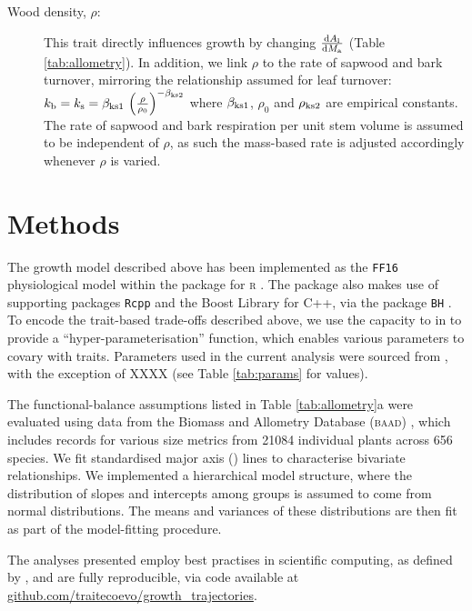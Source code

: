 \documentclass[a4paper,11pt]{article}
\begin{document}
\begin{description}
\item[Wood density, $\rho$:] This trait directly influences growth by changing $\frac{{\rm d}A_{\rm l}}{{\rm d}M_{\rm a}}$ (Table \ref{tab:allometry}). In addition, we link $\rho$ to the rate of sapwood and bark turnover, mirroring the relationship assumed for leaf turnover: $k_{\rm b} = k_{\rm s} = \beta_{{\rm ks1}} \, \left(\frac{\rho}{\rho_0}\right)^{-\beta_{{\rm ks2}}}$ where $\beta_{{\rm ks1}}$, $\rho_0$ and $\rho_{{\rm ks2}}$ are empirical constants. The rate of sapwood and bark respiration per unit stem volume is assumed to be independent of $\rho$, as such the mass-based rate is adjusted accordingly  whenever $\rho$ is varied.
 \end{description}

\section{Methods}

The growth model described above has been implemented as the \texttt{FF16} physiological model within the {\plant} package \citep{Falster-2016} for \textsc{r} \citep{R-2015}. The {\plant} package also makes use of supporting packages \texttt{Rcpp} \citep{Eddelbuettel-2013} and the Boost Library for C++\citep{Schaling-2014}, via the package \texttt{BH} \citep{Eddelbuettel-2015}. To encode the trait-based trade-offs described above, we use the capacity to in {\plant} to provide a ``hyper-parameterisation'' function, which enables various parameters to covary with traits. Parameters used in the current analysis were sourced from \citet{Falster-2016}, with the exception of XXXX (see Table \ref{tab:params} for values).

The functional-balance assumptions listed in Table \ref{tab:allometry}a were evaluated using data from the Biomass and Allometry Database (\textsc{baad}) \citep{Falster-2015b}, which includes records for various size metrics from 21084 individual plants across 656 species. We fit standardised major axis ({\sma}) lines \citep{Warton-2006} to characterise bivariate relationships. We implemented a hierarchical model structure, where the distribution of slopes and intercepts among groups is assumed to come from normal distributions. The means and variances of these distributions are then fit as part of the model-fitting procedure.

The analyses presented employ best practises in scientific computing, as defined by \citep{Wilson-2014}, and are fully reproducible, via code available at
\href{https://github.com/traitecoevo/growth\_trajectories}{github.com/traitecoevo/growth\_trajectories}.
\end{document}
